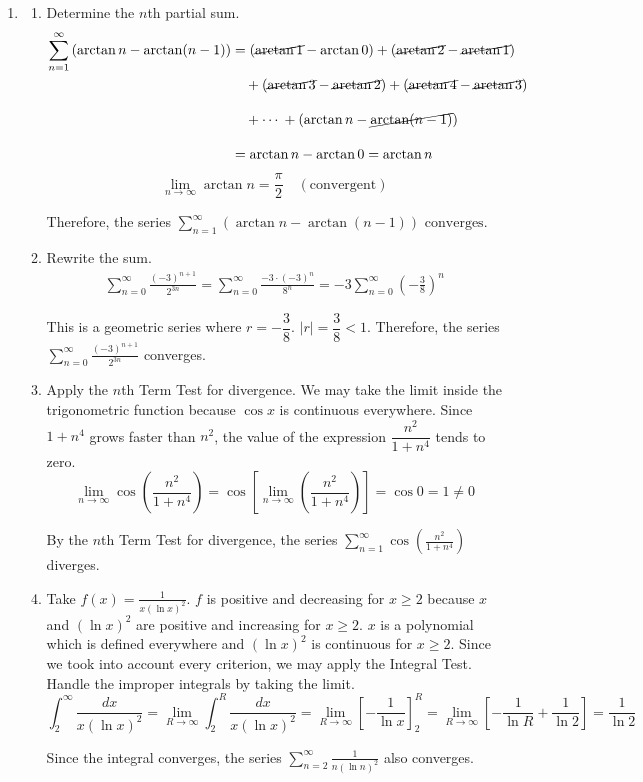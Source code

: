 \documentclass[a4paper, 12pt]{article}
\begin{document}
\begin{enumerate}[leftmargin=*,label=\textbf{\arabic*.}]
\item
\begin{enumerate}[leftmargin=*,label=\textbf{\alph*.}]
\item Determine the $n$th partial sum.
\begin{align*}\sum_{n=1}^{\infty}\left(\arctan n -\arctan(n-1)\right)&=\left(\cancel{\arctan1}-\arctan0\right)+\left(\cancel{\arctan2}-\cancel{\arctan1}\right)\\&\quad+\left(\cancel{\arctan3}-\cancel{\arctan2}\right)+\left(\cancel{\arctan4}-\cancel{\arctan3}\right)\\[1em]&\quad +\cdots\:+\left(\arctan n-\cancel{\arctan(n-1)}\right)\\[1em]&=\arctan n-\arctan0=\arctan n\end{align*}
\[\lim_{n\to\infty}\arctan n=\frac\pi2\quad(\text{convergent})\]

Therefore, the series $\displaystyle\sum_{n=1}^{\infty}\left(\arctan n -\arctan(n-1)\right)$ $\boxed{\text{converges}}$.

\item Rewrite the sum.
\begin{align*}\sum_{n=0}^{\infty}\frac{(-3)^{n+1}}{2^{3n}}=\sum_{n=0}^{\infty}\frac{-3\cdot(-3)^n}{8^n}=-3\sum_{n=0}^{\infty}\left(-\frac38\right)^n\end{align*}

This is a geometric series where $r=-\dfrac38$. $|r|=\dfrac38<1$. Therefore, the series $\displaystyle\sum_{n=0}^{\infty}\frac{(-3)^{n+1}}{2^{3n}}$ converges.

\item Apply the $n$th Term Test for divergence. We may take the limit inside the trigonometric function because $\cos x$ is continuous everywhere. Since $1+n^4$ grows faster than $n^2$, the value of the expression $\dfrac{n^2}{1+n^4}$ tends to zero.
\[\lim_{n\to\infty}\cos\left(\frac{n^2}{1+n^4}\right)=\cos\left[\lim_{n\to\infty}\left(\frac{n^2}{1+n^4}\right)\right]=\cos0=1\neq0\]

By the $n$th Term Test for divergence, the series $\displaystyle\sum_{n=1}^\infty\cos\left(\frac{n^2}{1+n^4}\right)$ diverges.

\item Take $\displaystyle f(x)=\frac1{x(\ln x)^2}$. $f$ is positive and decreasing for $x\geq2$ because $x$ and $(\ln x)^2$ are positive and increasing for $x\geq2$. $x$ is a polynomial which is defined everywhere and $(\ln x)^2$ is continuous for $x\geq2$. Since we took into account every criterion, we may apply the Integral Test. Handle the improper integrals by taking the limit.
\[\int_2^{\infty}\frac{dx}{x(\ln x)^2}=\lim_{R\to\infty}\int_2^R\frac{dx}{x(\ln x)^2}=\lim_{R\to\infty}\left[-\frac1{\ln x}\right]_2^R=\lim_{R\to\infty}\left[-\frac1{\ln R}+\frac1{\ln2}\right]=\frac1{\ln 2}\]

Since the integral converges, the series $\displaystyle\sum_{n=2}^\infty\frac1{n(\ln n)^2}$ also converges.
\end{enumerate}
\end{enumerate}
\end{document}
